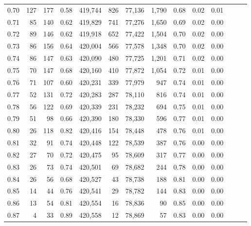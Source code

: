 \begin{tabular}{rrrrrrrrrrrrrr}
0.70 &     127 &    177 &  0.58 &  419,744 &      826 &  77,136 &   1,790 &  0.68 &  0.02 &      0.01 \\
0.71 &      85 &    140 &  0.62 &  419,829 &      741 &  77,276 &   1,650 &  0.69 &  0.02 &      0.00 \\
0.72 &      89 &    146 &  0.62 &  419,918 &      652 &  77,422 &   1,504 &  0.70 &  0.02 &      0.00 \\
0.73 &      86 &    156 &  0.64 &  420,004 &      566 &  77,578 &   1,348 &  0.70 &  0.02 &      0.00 \\
0.74 &      86 &    147 &  0.63 &  420,090 &      480 &  77,725 &   1,201 &  0.71 &  0.02 &      0.00 \\
0.75 &      70 &    147 &  0.68 &  420,160 &      410 &  77,872 &   1,054 &  0.72 &  0.01 &      0.00 \\
0.76 &      71 &    107 &  0.60 &  420,231 &      339 &  77,979 &     947 &  0.74 &  0.01 &      0.00 \\
0.77 &      52 &    131 &  0.72 &  420,283 &      287 &  78,110 &     816 &  0.74 &  0.01 &      0.00 \\
0.78 &      56 &    122 &  0.69 &  420,339 &      231 &  78,232 &     694 &  0.75 &  0.01 &      0.00 \\
0.79 &      51 &     98 &  0.66 &  420,390 &      180 &  78,330 &     596 &  0.77 &  0.01 &      0.00 \\
0.80 &      26 &    118 &  0.82 &  420,416 &      154 &  78,448 &     478 &  0.76 &  0.01 &      0.00 \\
0.81 &      32 &     91 &  0.74 &  420,448 &      122 &  78,539 &     387 &  0.76 &  0.00 &      0.00 \\
0.82 &      27 &     70 &  0.72 &  420,475 &       95 &  78,609 &     317 &  0.77 &  0.00 &      0.00 \\
0.83 &      26 &     73 &  0.74 &  420,501 &       69 &  78,682 &     244 &  0.78 &  0.00 &      0.00 \\
0.84 &      26 &     56 &  0.68 &  420,527 &       43 &  78,738 &     188 &  0.81 &  0.00 &      0.00 \\
0.85 &      14 &     44 &  0.76 &  420,541 &       29 &  78,782 &     144 &  0.83 &  0.00 &      0.00 \\
0.86 &      13 &     54 &  0.81 &  420,554 &       16 &  78,836 &      90 &  0.85 &  0.00 &      0.00 \\
0.87 &       4 &     33 &  0.89 &  420,558 &       12 &  78,869 &      57 &  0.83 &  0.00 &      0.00 \\

\end{tabular}
